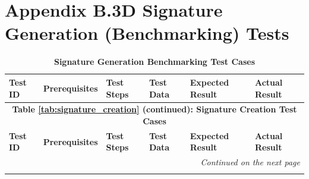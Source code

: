 \documentclass[]{final_report}
\theoremstyle{definition}
\begin{document}
\section{Appendix B.3D Signature Generation (Benchmarking) Tests}

\begin{longtable}{|l|p{2.5cm}|p{2.8cm}|p{3cm}|p{2cm}|p{1.5cm}|}
  \caption{\textbf{Signature Generation Benchmarking Test Cases}} \\
  \hline
  \textbf{Test ID} & \textbf{Prerequisites} & \textbf{Test Steps} & \textbf{Test Data} & \textbf{Expected Result} & \textbf{Actual Result} \\
  \hline
  \endfirsthead

  \multicolumn{6}{c}{\textbf{Table \ref{tab:signature_creation} (continued): Signature Creation Test Cases}} \\
  \hline
  \textbf{Test ID} & \textbf{Prerequisites} & \textbf{Test Steps} & \textbf{Test Data} & \textbf{Expected Result} & \textbf{Actual Result} \\
  \hline
  \endhead

  \hline
  \multicolumn{6}{r}{\textit{Continued on the next page}} \\
  \endfoot


\end{longtable}
\end{document}
